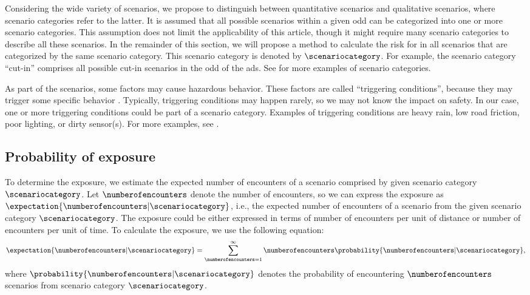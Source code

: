 Considering the wide variety of scenarios, we propose to distinguish between quantitative scenarios and qualitative scenarios, where scenario categories refer to the latter.
It is assumed that all possible scenarios within a given \ac{odd} can be categorized into one or more scenario categories. 
This assumption does not limit the applicability of this article, though it might require many scenario categories to describe all these scenarios.
In the remainder of this section, we will propose a method to calculate the risk for  in all scenarios that are categorized by the same scenario category.
This scenario category is denoted by $\scenariocategory$.
For example, the scenario category ``cut-in'' comprises all possible cut-in scenarios in the \ac{odd} of the \ac{ads}.
See \autocite{degelder2019scenariocategories} for more examples of scenario categories.


\begin{remark}
	As part of the scenarios, some factors may cause hazardous behavior. 
	These factors are called ``triggering conditions'', because they may trigger some specific behavior \autocite{ISO21448}.
	Typically, triggering conditions may happen rarely, so we may not know the impact on safety. 
	In our case, one or more triggering conditions could be part of a scenario category.
	Examples of triggering conditions are heavy rain, low road friction, poor lighting, or dirty sensor(s). 
	For more examples, see \autocite{ISO21448}.
\end{remark}



\subsection{Probability of exposure}
\label{sec:exposure}

To determine the exposure, we estimate the expected number of encounters of a scenario comprised by given scenario category $\scenariocategory$.
Let $\numberofencounters$ denote the number of encounters, so we can express the exposure as $\expectation{\numberofencounters|\scenariocategory}$, i.e., the expected number of encounters of a scenario from the given scenario category $\scenariocategory$.
The exposure could be either expressed in terms of number of encounters per unit of distance or number of encounters per unit of time.
To calculate the exposure, we use the following equation:
\begin{equation}
	\label{eq:exposure}
	\expectation{\numberofencounters|\scenariocategory}
	 = \sum_{\numberofencounters=1}^{\infty} \numberofencounters \probability{\numberofencounters|\scenariocategory},
\end{equation}
where $\probability{\numberofencounters|\scenariocategory}$ denotes the probability of encountering $\numberofencounters$ scenarios from scenario category $\scenariocategory$.

